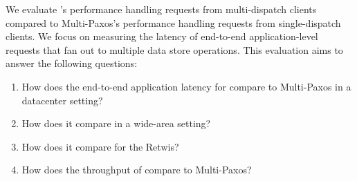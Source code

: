 We evaluate \sys{}'s performance handling requests from multi-dispatch clients
compared to Multi-Paxos's performance handling requests from single-dispatch
clients.  We focus on measuring the latency of end-to-end
application-level requests that fan out to multiple data store operations.
This evaluation aims to answer the following questions:
\begin{enumerate}[leftmargin=*]
    \item How does the end-to-end application latency for \sys{} compare to Multi-Paxos in a datacenter setting?
    \item How does it compare in a wide-area setting?
    \item How does it compare for the Retwis?
    \item How does the throughput of \sys{} compare to Multi-Paxos?
\end{enumerate}

